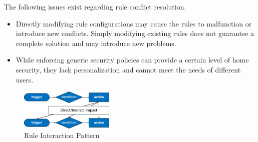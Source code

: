 The following issues exist regarding rule conflict resolution.
\begin{itemize}
	\item Directly modifying rule configurations may cause the rules to malfunction or introduce new conflicts. Simply modifying existing rules does not guarantee a complete solution and may introduce new problems\cite{celik2018soteria,chen2019multi,chi2020cross,ding2018safety,hsu2019safechain,wang2019charting}.
	
	\item While enforcing generic security policies can provide a certain level of home security, they lack personalization and cannot meet the needs of different users\cite{celik2019iotguard,ding2021iotsafe}.
\end{itemize}

\begin{figure}[htbp]
	\centering
	\includegraphics[width=0.4\textwidth]{figure/classification_observation.png}
	\caption{Rule Interaction Pattern}
	\label{classification_observation}
\end{figure}

